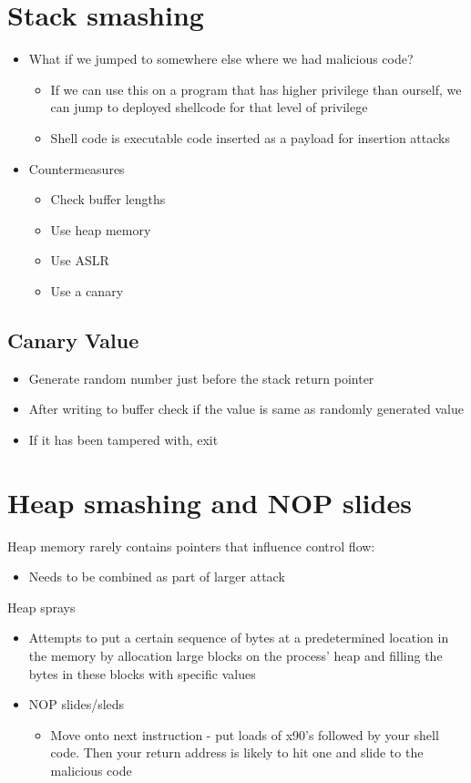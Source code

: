 \documentclass{article}[18pt]
\begin{document}
\section{Stack smashing}
\begin{itemize}
	\item What if we jumped to somewhere else where we had malicious code?
	\begin{itemize}
		\item If we can use this on a program that has higher privilege than ourself, we can jump to deployed shellcode for that level of privilege
		\item Shell code is executable code inserted as a payload for insertion attacks
	\end{itemize}
	\item Countermeasures
	\begin{itemize}
		\item Check buffer lengths
		\item Use heap memory
		\item Use ASLR
		\item Use a canary
	\end{itemize}
\end{itemize}
\subsection{Canary Value}
\begin{itemize}
	\item Generate random number just before the stack return pointer
	\item After writing to buffer check if the value is same as randomly generated value
	\item If it has been tampered with, exit
\end{itemize}
\section{Heap smashing and NOP slides}
Heap memory rarely contains pointers that influence control flow:
\begin{itemize}
	\item Needs to be combined as part of larger attack
\end{itemize}
Heap sprays
\begin{itemize}
	\item Attempts to put a certain sequence of bytes at a predetermined location in the memory by allocation large blocks on the process' heap and filling the bytes in these blocks with specific values
	\item NOP slides/sleds
	\begin{itemize}
		\item Move onto next instruction - put loads of x90's followed by your shell code. Then your return address is likely to hit one and slide to the malicious code
	\end{itemize}
\end{itemize}
\end{document}
